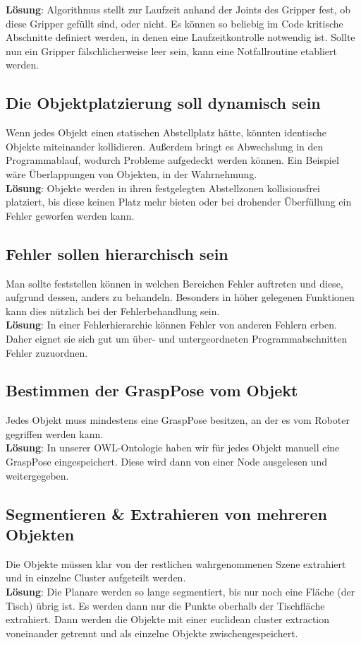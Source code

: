 \documentclass{suturo}
\begin{document}
\textbf{Lösung}: Algorithmus stellt zur Laufzeit anhand der Joints des Gripper fest, ob diese Gripper gefüllt sind, oder nicht. Es können so beliebig im Code kritische Abschnitte definiert werden, in denen eine Laufzeitkontrolle notwendig ist. Sollte nun ein Gripper fälschlicherweise leer sein, kann eine Notfallroutine etabliert werden.

\subsection{Die Objektplatzierung soll dynamisch sein}
Wenn jedes Objekt einen statischen Abstellplatz hätte, könnten identische Objekte miteinander kollidieren. Außerdem bringt es Abwechslung in den Programmablauf, wodurch Probleme aufgedeckt werden können. Ein Beispiel wäre Überlappungen von Objekten, in der Wahrnehmung. \\

\textbf{Lösung}: Objekte werden in ihren festgelegten Abstellzonen kollisionsfrei platziert, bis diese keinen Platz mehr bieten oder bei drohender Überfüllung ein Fehler geworfen werden kann.


\subsection{Fehler sollen hierarchisch sein}
Man sollte feststellen können in welchen Bereichen Fehler auftreten und diese, aufgrund dessen, anders zu behandeln. Besonders in höher gelegenen Funktionen kann dies nützlich bei der Fehlerbehandlung sein. \\

\textbf{Lösung}: In einer Fehlerhierarchie können Fehler von anderen Fehlern erben. Daher eignet sie sich gut um über- und untergeordneten Programmabschnitten Fehler zuzuordnen.

\subsection{Bestimmen der GraspPose vom Objekt}
Jedes Objekt muss mindestens eine GraspPose besitzen, an der es vom Roboter gegriffen werden kann.\\

\textbf{Lösung}: In unserer OWL-Ontologie haben wir für jedes Objekt manuell eine GraspPose eingespeichert. Diese wird dann von einer Node ausgelesen und weitergegeben.

\subsection{Segmentieren \& Extrahieren von mehreren Objekten}
Die Objekte müssen klar von der restlichen wahrgenommenen Szene extrahiert und in einzelne Cluster aufgeteilt werden.\\
\textbf{Lösung}: Die Planare werden so lange segmentiert, bis nur noch eine Fläche (der Tisch) übrig ist. Es werden dann nur die Punkte oberhalb der Tischfläche extrahiert. Dann werden die Objekte mit einer euclidean cluster extraction voneinander getrennt und als einzelne Objekte zwischengespeichert.
\end{document}
